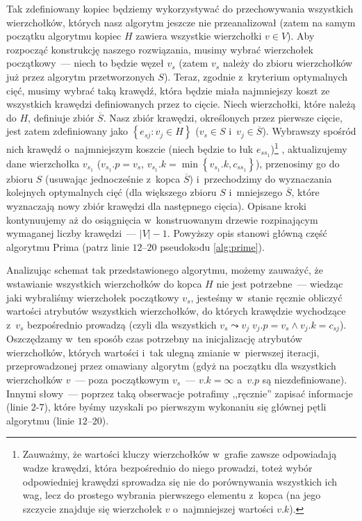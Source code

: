 Tak zdefiniowany kopiec będziemy wykorzystywać do przechowywania wszystkich wierzchołków, których nasz algorytm jeszcze nie przeanalizował (zatem na samym początku algorytmu kopiec $H$ zawiera wszystkie wierzchołki $v \in V$).
Aby rozpocząć konstrukcję naszego rozwiązania, musimy wybrać wierzchołek początkowy~--- niech to będzie węzeł $v_{s}$ (zatem $v_{s}$ należy do zbioru wierzchołków już przez algorytm przetworzonych $S$).
Teraz, zgodnie z~kryterium optymalnych cięć, musimy wybrać taką krawędź, która będzie miała najmniejszy koszt ze wszystkich krawędzi definiowanych przez to cięcie.
Niech wierzchołki, które należą do $H$, definiuje zbiór $\overline{S}$.
Nasz zbiór krawędzi, określonych przez pierwsze cięcie, jest zatem zdefiniowany jako $\left\{ e_{sj} : v_{j} \in H \right\}$ ($v_{s} \in S$ i~$v_{j} \in \overline{S}$).
Wybrawszy spośród nich krawędź o~najmniejszym koszcie (niech będzie to łuk $e_{ss_{1}}$)\footnote{
	Zauważmy, że wartości kluczy wierzchołków w~grafie zawsze odpowiadają wadze krawędzi, która bezpośrednio do niego prowadzi, toteż wybór odpowiedniej krawędzi sprowadza się nie do porównywania wszystkich ich wag, lecz do prostego wybrania pierwszego elementu z~kopca (na jego szczycie znajduje się wierzchołek $v$ o~najmniejszej wartości $v.k$).}
, aktualizujemy dane wierzchołka $v_{s_{1}}$ ($v_{s_{1}}.p = v_{s}$, $v_{s_{1}}.k = \min \left\{ v_{s_{1}}.k, c_{ss_{1}} \right\}$), przenosimy go do zbioru $S$ (usuwając jednocześnie z~kopca $\overline{S}$) i~przechodzimy do wyznaczania kolejnych optymalnych cięć (dla większego zbioru $S$ i~mniejszego $\overline{S}$, które wyznaczają nowy zbiór krawędzi dla następnego cięcia).
Opisane kroki kontynuujemy aż do osiągnięcia w~konstruowanym drzewie rozpinającym wymaganej liczby krawędzi~--- $\left| V \right| - 1$.
Powyższy opis stanowi główną część algorytmu Prima (patrz linie $12$--$20$ pseudokodu \ref{alg:prime}).

Analizując schemat tak przedstawionego algorytmu, możemy zauważyć, że wstawianie wszystkich wierzchołków do kopca $H$ nie jest potrzebne~--- wiedząc jaki wybraliśmy wierzchołek początkowy $v_{s}$, jesteśmy w~stanie ręcznie obliczyć wartości atrybutów wszystkich wierzchołków, do których krawędzie wychodzące z~$v_{s}$ bezpośrednio prowadzą (czyli dla wszystkich $v_{s} \leadsto v_{j} \; v_{j}.p = v_{s} \wedge v_{j}.k = c_{sj}$).
Oszczędzamy w~ten sposób czas potrzebny na inicjalizację atrybutów wierzchołków, których wartości i~tak ulegną zmianie w~pierwszej iteracji, przeprowadzonej przez omawiany algorytm (gdyż na początku dla wszystkich wierzchołków $v$~--- poza początkowym $v_{s}$~--- $v.k = \infty$ a~$v.p$ są niezdefiniowane).
Innymi słowy~--- poprzez taką obserwacje potrafimy ,,ręcznie'' zapisać informacje (linie $2$-$7$), które byśmy uzyskali po pierwszym wykonaniu się głównej pętli algorytmu (linie $12$--$20$).

